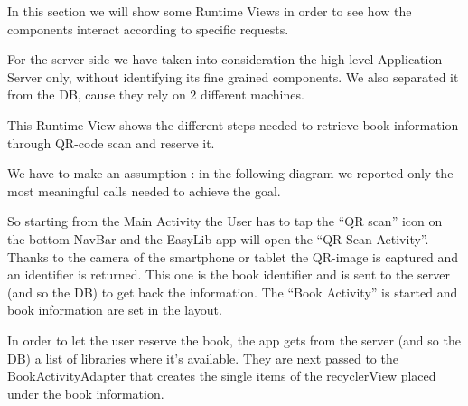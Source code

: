\vspace*{-5mm}
In this section we will show some Runtime Views in order to see how the components interact according to specific requests.\par
For the server-side we have taken into consideration the high-level Application Server only, without identifying its fine grained components. We also separated it from the DB, cause they rely on 2 different machines.

\vspace*{0.5cm}

This Runtime View shows the different steps needed to retrieve book information through QR-code scan and reserve it.\par
We have to make an assumption : in the following diagram we reported only the most meaningful calls needed to achieve the goal.\par
So starting from the Main Activity the User has to tap the “QR scan” icon on the bottom NavBar and the EasyLib app will open the “QR Scan Activity”. Thanks to the camera of the smartphone or tablet the QR-image is captured and an identifier is returned. This one is the book identifier and is sent to the server (and so the DB) to get back the information. The “Book Activity” is started and book information are set in the layout.\par
In order to let the user reserve the book, the app gets from the server (and so the DB) a list of libraries where it’s available. They are next passed to the BookActivityAdapter that creates the single items of the recyclerView placed under the book information.
\newpage
\vspace*{0cm}
